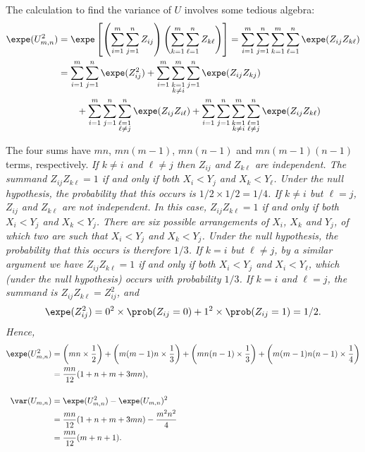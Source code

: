 The calculation to find the variance of $U$ involves some tedious algebra:
\begin{align*}
\expe(U_{m,n}^2)
	& = \expe\left[\left(\sum_{i=1}^m\sum_{j=1}^n Z_{ij}\right)\left(\sum_{k=1}^m\sum_{\ell=1}^n Z_{k\ell}\right)\right]
	= \sum_{i=1}^m\sum_{j=1}^n\sum_{k=1}^m\sum_{\ell=1}^n \expe(Z_{ij}Z_{k\ell}) \\
	& = \sum_{i=1}^m\sum_{j=1}^n\expe(Z_{ij}^2) 
			+ \sum_{i=1}^m\sum_{\substack{k=1\\k\neq i}}^m\sum_{j=1}^n\expe(Z_{ij}Z_{kj}) \\
	& \qquad + \sum_{i=1}^m\sum_{j=1}^n\sum_{\substack{\ell=1\\\ell\neq j}}^n\expe(Z_{ij}Z_{i\ell})
			+ \sum_{i=1}^m\sum_{j=1}^n\sum_{\substack{k=1\\k\neq i}}^m\sum_{\substack{\ell=1\\\ell\neq j}}^n\expe(Z_{ij}Z_{k\ell}) \\
\end{align*}

The four sums have $mn$, $mn(m-1)$, $mn(n-1)$ and $mn(m-1)(n-1)$ terms, respectively.
\bit
\it 
If $k\neq i$ and $\ell\neq j$ then $Z_{ij}$ and $Z_{k\ell}$ are independent. The summand $Z_{ij}Z_{k\ell}=1$ if and only if both $X_i<Y_j$ and $X_k<Y_{\ell}$. Under the null hypothesis, the probability that this occurs is $1/2\times 1/2 = 1/4$.
\it
If $k\neq i$ but $\ell=j$, $Z_{ij}$ and $Z_{k\ell}$ are not independent. In this case, $Z_{ij}Z_{k\ell}=1$ if and only if both $X_i<Y_j$ and $X_k<Y_j$. There are six possible arrangements of $X_i$, $X_k$ and $Y_j$, of which two are such that $X_i<Y_j$ and $X_k<Y_j$. Under the null hypothesis, the probability that this occurs is therefore $1/3$.
\it
If $k=i$ but $\ell\neq j$, by a similar argument we have $Z_{ij}Z_{k\ell}=1$ if and only if both $X_i<Y_j$ and $X_i<Y_{\ell}$, which (under the null hypothesis) occurs with probability $1/3$.
\it
If $k=i$ and $\ell=j$, the summand is $Z_{ij}Z_{k\ell}=Z_{ij}^2$, and 
\[
\expe(Z_{ij}^2)= 0^2\times \prob(Z_{ij}=0) + 1^2\times \prob(Z_{ij}=1) = 1/2.
\]
\eit
Hence, 
\begin{align*}
\expe(U_{m,n}^2)
	& = \left(mn\times\frac{1}{2}\right) + \left(m(m-1)n\times\frac{1}{3}\right) 
			+ \left(mn(n-1)\times\frac{1}{3}\right) + \left(m(m-1)n(n-1)\times\frac{1}{4}\right) \\
	& = \frac{mn}{12}(1 + n + m + 3mn), \\[3ex]
\var(U_{m,n})
	& = \expe(U_{m,n}^2) - \expe(U_{m,n})^2 \\
	& = \frac{mn}{12}(1 + n + m + 3mn) - \frac{m^2n^2}{4} \\
	& = \frac{mn}{12}(m+n+1).
\end{align*}

